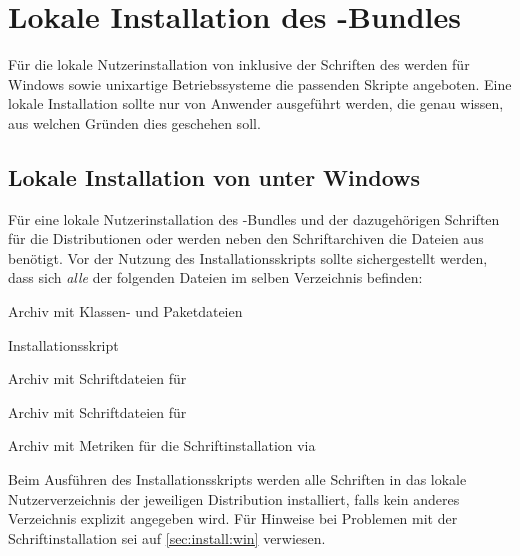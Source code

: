 \section{Lokale Installation des \TUDScript-Bundles}
%
%
%
Für die lokale Nutzerinstallation von \TUDScript inklusive der Schriften des 
\CDs werden für Windows sowie unixartige Betriebssysteme die passenden Skripte 
angeboten. Eine lokale Installation sollte nur von Anwender ausgeführt werden, 
die genau wissen, aus welchen Gründen dies geschehen soll.


\subsection{Lokale Installation von \TUDScript unter Windows}
Für eine lokale Nutzerinstallation des \TUDScript-Bundles und der dazugehörigen 
Schriften für die Distributionen  oder 
 werden neben den Schriftarchiven die Dateien aus
benötigt. Vor der Nutzung des Installationsskripts 
 sollte sichergestellt werden, dass sich 
\emph{alle} der folgenden Dateien im selben Verzeichnis befinden:
%
\settowidth{}%
\begin{description}[labelwidth=\tempdim,labelsep=1em]
  \item[\File{tudscr\_\vTUDScript.zip}]Archiv mit Klassen- und Paketdateien
  \item[\File{tudscr\_\vTUDScript\_install.bat}]Installationsskript
  \item[\File{Univers\_PS.zip}]Archiv mit Schriftdateien für \Univers
  \item[\File{DIN\_Bd\_PS.zip}]Archiv mit Schriftdateien für \DIN
  \item[\File{tudscr\_fonts\_install.zip}]Archiv mit Metriken für die
    Schriftinstallation via 
\end{description}
%
Beim Ausführen des Installationsskripts werden alle Schriften in das lokale 
Nutzerverzeichnis der jeweiligen Distribution installiert, falls kein anderes 
Verzeichnis explizit angegeben wird. Für Hinweise bei Problemen mit der 
Schriftinstallation sei auf \autoref{sec:install:win} verwiesen.



